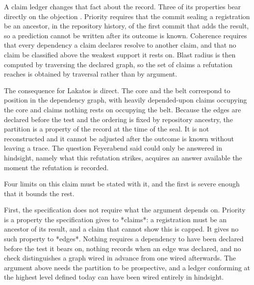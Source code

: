 \documentclass[11pt,letterpaper]{article}
\begin{document}
A claim ledger changes that fact about the record. Three of its properties bear
directly on the objection \citep{pecls}. Priority requires that the commit
sealing a registration be an ancestor, in the repository history, of the first
commit that adds the result, so a prediction cannot be written after its
outcome is known. Coherence requires that every dependency a claim declares
resolve to another claim, and that no claim be classified above the weakest
support it rests on. Blast radius is then computed by traversing the declared
graph, so the set of claims a refutation reaches is obtained by traversal rather
than by argument.

The consequence for Lakatos is direct. The core and the belt correspond to
position in the dependency graph, with heavily depended-upon claims occupying the
core and claims nothing rests on occupying the belt. Because the edges are
declared before the test and the ordering is fixed by repository ancestry, the
partition is a property of the record at the time of the seal. It is not
reconstructed and it cannot be adjusted after the outcome is known without
leaving a trace. The question Feyerabend said could only be answered in hindsight,
namely what this refutation strikes, acquires an answer available the moment the
refutation is recorded.

Four limits on this claim must be stated with it, and the first is severe
enough that it bounds the rest.

First, the specification does not require what the argument depends on. Priority
is a property the specification gives to *claims*: a registration must be an
ancestor of its result, and a claim that cannot show this is capped. It gives no
such property to *edges*. Nothing requires a dependency to have been declared
before the test it bears on, nothing records when an edge was declared, and no
check distinguishes a graph wired in advance from one wired afterwards. The
argument above needs the partition to be prospective, and a ledger conforming at
the highest level defined today can have been wired entirely in hindsight.
\end{document}
